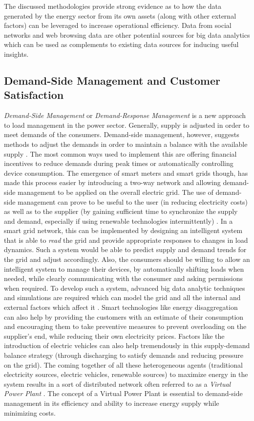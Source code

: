 The discussed methodologies provide strong evidence as to how the data generated by the energy sector from its own assets (along with other external factors) can be leveraged to increase operational efficiency. Data from social networks and web browsing data are other potential sources for big data analytics which can be used as complements to existing data sources for inducing useful insights.

\subsection{Demand-Side Management and Customer Satisfaction}
{\em Demand-Side Management} or {\em Demand-Response Management} is a new approach to load management in the power sector. Generally, supply is adjusted in order to meet demands of the consumers. Demand-side management, however, suggests methods to adjust the demands in order to maintain a balance with the available supply \cite{acm10}. The most common ways used to implement this are offering financial incentives to reduce demands during peak times or automatically controlling device consumption. The emergence of smart meters and smart grids though, has made this process easier by introducing a two-way network and allowing demand-side management to be applied on the overall electric grid. The use of demand-side management can prove to be useful to the user (in reducing electricity costs) as well as to the supplier (by gaining sufficient time to synchronize the supply and demand, especially if using renewable technologies intermittently) \cite{acm10}. In a smart grid network, this can be implemented by designing an intelligent system that is able to {\em read} the grid and provide appropriate responses to changes in load dynamics. Such a system would be able to predict supply and demand trends for the grid and adjust accordingly. Also, the consumers should be willing to allow an intelligent system to manage their devices, by automatically shifting loads when needed, while clearly communicating with the consumer and asking permissions when required. To develop such a system, advanced big data analytic techniques and simulations are required which can model the grid and all the internal and external factors which affect it \cite{acm10}. Smart technologies like energy disaggregation can also help by providing the customers with an estimate of their consumption and encouraging them to take preventive measures to prevent overloading on the supplier's end, while reducing their own electricity prices. Factors like the introduction of electric vehicles can also help tremendously in this supply-demand balance strategy (through discharging to satisfy demands and reducing pressure on the grid). The coming together of all these heterogeneous agents (traditional electricity sources, electric vehicles, renewable sources) to maximize energy in the system results in a sort of distributed network often referred to as a {\em Virtual Power Plant} \cite{acm10}. The concept of a Virtual Power Plant is essential to demand-side management in its efficiency and ability to increase energy supply while minimizing costs.\\
